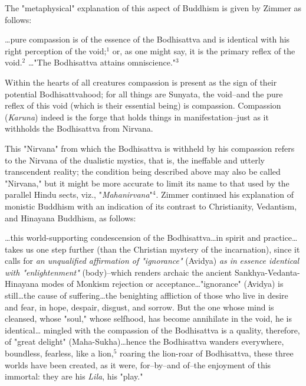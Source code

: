 The "metaphysical" explanation of this aspect of Buddhism
is given by Zimmer as follows:\par
\begin{center}
	\parbox{0.8\textwidth}{
		\hspace*{5mm}\dots pure compassion is of the essence of the Bodhisattva
		and is  identical with his right perception of the void;$^{1}$
		or, as one might say, it is the primary reflex of the void.$^{2}$
		\dots "The Bodhisattva attains omniscience."$^{3}$\par
		\vspace*{\baselineskip}
		\hspace*{5mm}Within the hearts of all creatures compassion is present
		as the sign of their potential Bodhisattvahood; for all things
		are Sunyata, the void--and the pure reflex of this void (which
		is their essential being) is compassion. Compassion (\textit{Karuna})
		indeed is the forge that holds things in manifestation--just
		as it withholds the Bodhisattva from Nirvana.\par
	}%
\end{center}
\hspace*{5mm}This "Nirvana" from which the Bodhisattva is withheld by his
compassion refers to the Nirvana of the dualistic mystics,
that is, the ineffable and utterly transcendent reality; the
condition being described above may also be called "Nirvana,"
but it might be more accurate to limit its name to that used
by the parallel Hindu sects, viz., "\textit{Mahanirvana}"$^{4}$. Zimmer
continued his explanation of monistic Buddhism with an indication
of its contrast to Christianity, Vedantism, and Hinayana
Buddhism, as follows:\par
\begin{center}
	\parbox{0.8\textwidth}{
		\hspace*{5mm}\dots this world-supporting condescension of the Bodhisattva\dots in
		spirit and practice\dots takes us one step further (than
		the Christian mystery of the incarnation), since it calls for
		\textit{an unqualified affirmation of "ignorance"} (Avidya) \textit{as in}
		\textit{essence identical with "enlightenment"} (body)--which renders
		archaic the ancient Sankhya-Vedanta-Hinayana modes of Monkism
		rejection or acceptance\dots "ignorance" (Avidya) is still\dots the
		cause of suffering\dots the benighting affliction of those
		who live in desire and fear, in hope, despair, disgust, and
		sorrow. But the one whose mind is cleansed, whose "soul,"
		whose selfhood, has become annihilate in the void, he is identical\dots
		mingled with the compassion of the Bodhisattva is a quality,
		therefore, of "great delight" (Maha-Sukha)\dots hence the
		Bodhisattva wanders everywhere, boundless, fearless, like a
		lion,$^{5}$ roaring the lion-roar of Bodhisattva, these
		three worlds have been created, as it were, for--by--and of--the
		enjoyment of this immortal: they are his \textit{Lila}, his "play."\linebreak
		\null\par
		\vspace*{-\baselineskip}
	}%
\end{center}
